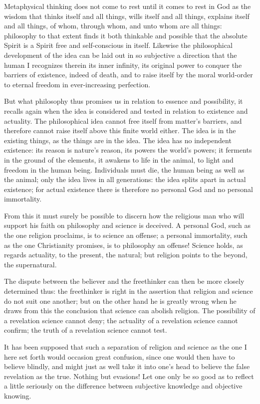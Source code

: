 \documentclass[12pt,a4paper]{book}
\begin{document}
Metaphysical thinking does not come to rest until it comes to rest in God as the wisdom
that thinks itself and all things, wills itself and all things, explains itself and all
things, of whom, through whom, and unto whom are all things: philosophy to that extent
finds it both thinkable and possible that the absolute Spirit is a Spirit free and
self-conscious in itself. Likewise the philosophical development of the idea can be laid
out in so subjective a direction that the human I recognizes therein its inner infinity,
its original power to conquer the barriers of existence, indeed of death, and to raise
itself by the moral world-order to eternal freedom in ever-increasing perfection.

But what philosophy thus promises us in relation to essence and possibility, it recalls
again when the idea is considered and tested in relation to existence and actuality. The
philosophical idea cannot free itself from matter's barriers,
and therefore cannot raise itself above this finite world either. The idea is in the
existing things, as the things are in the idea. The idea has no independent existence: its
reason is nature's reason, its powers the world's powers; it ferments in the ground of the
elements, it awakens to life in the animal, to light and freedom in the human being.
Individuals must die, the human being as well as the animal; only the idea lives in all
generations: the idea splits apart in actual existence; for actual existence there is
therefore no personal God and no personal immortality.

From this it must surely be possible to discern how the religious man who will support his
faith on philosophy and science is deceived. A personal God, such as the one religion
proclaims, is to science an offense; a personal immortality, such as the one Christianity
promises, is to philosophy an offense! Science holds, as regards actuality, to the present,
the natural; but religion points to the beyond, the supernatural.

The dispute between the believer and the freethinker can then be more closely determined
thus: the freethinker is right in the assertion that religion and science do not suit one
another; but on the other hand he is greatly wrong when he draws from this the conclusion
that science can abolish religion. The possibility of a revelation science cannot deny;
the actuality of a revelation science cannot confirm; the truth of a revelation science
cannot test.

It has been supposed that such a separation of religion and science as the one I here set
forth would occasion great confusion, since one would then have to believe blindly, and
might just as well take it into one's head to believe the false revelation as the true.
Nothing but evasions! Let one only be so good as to reflect a little seriously on the
difference between subjective knowledge and objective knowing.
\end{document}
